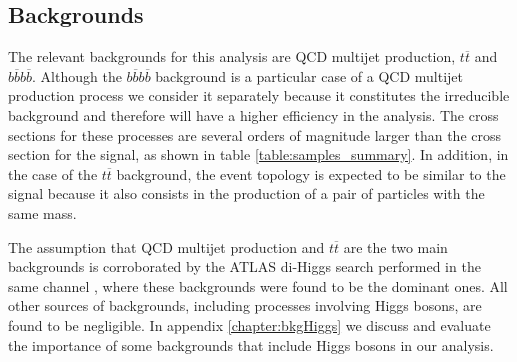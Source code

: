 

\subsection{Backgrounds}

The relevant backgrounds for this analysis are QCD multijet production, $t\overline{t}$ and $b\overline{b}b\overline{b}$. Although the $b\overline{b}b\overline{b}$ background is a particular case of a QCD multijet production process we consider it separately because it constitutes the irreducible background and therefore will have a higher efficiency in the analysis. The cross sections for these processes are several orders of magnitude larger than the cross section for the signal, as shown in table \ref{table:samples_summary}. In addition, in the case of the $t\overline{t}$ background, the event topology is expected to be similar to the signal because it also consists in the production of a pair of particles with the same mass.

The assumption that QCD multijet production and $t\overline{t}$ are the two main backgrounds is corroborated by the ATLAS di-Higgs search performed in the same channel \cite{hh2bbbbATLAS}, where these backgrounds were found to be the dominant ones. All other sources of backgrounds, including processes involving Higgs bosons, are found to be negligible. In appendix \ref{chapter:bkgHiggs} we discuss and evaluate the importance of some backgrounds that include Higgs bosons in our analysis.


